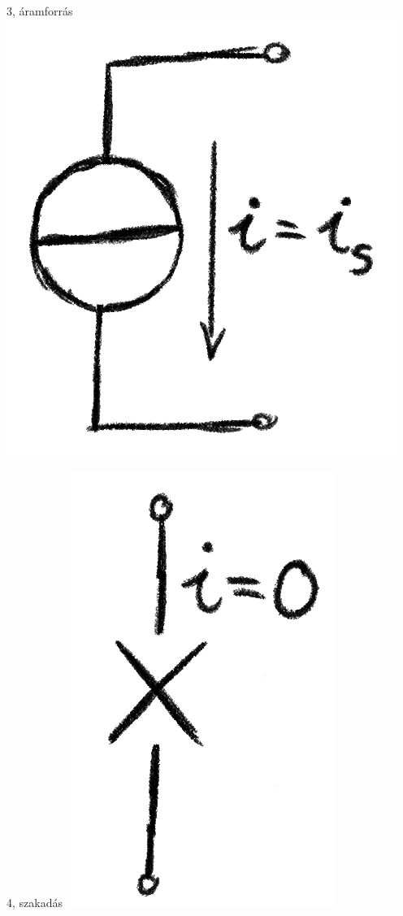 \documentclass[12pt]{article}
\begin{document}
            3, áramforrás \includegraphics{img/4.png}

            4, szakadás \includegraphics{img/5.png}
\end{document}
